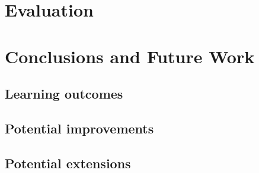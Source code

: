 \documentclass{report}
\begin{document}




\chapter{Evaluation}








\chapter{Conclusions and Future Work}

\section{Learning outcomes}

\section{Potential improvements}

\section{Potential extensions}








\begin{thebibliography}{9}







\end{thebibliography}
\end{document}

